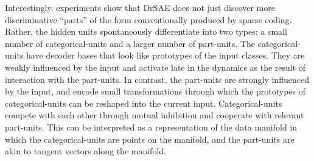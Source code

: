 \documentclass{article} %
\begin{document}
Interestingly, experiments show that DrSAE does not just discover more discriminative ``parts'' of the form conventionally produced by sparse coding. Rather, the hidden units spontaneously differentiate into two types: a small number of categorical-units and a larger number of part-units. The categorical-units have decoder bases that look like prototypes of the input classes. They are weakly influenced by the input and activate late in the dynamics as the result of interaction with the part-units. In contrast, the part-units are strongly influenced by the input, and encode small transformations through which the prototypes of categorical-units can be reshaped into the current input. 
Categorical-units compete with each other through mutual inhibition and cooperate with relevant part-units. This can be interpreted as a representation of the data manifold in which the categorical-units are points on the manifold, and the part-units are akin to tangent vectors along the manifold.  
\end{document}
